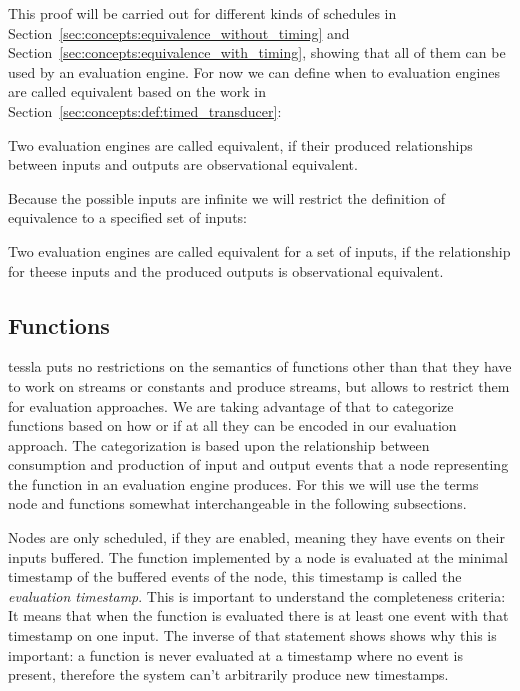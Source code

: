 This proof will be carried out for different kinds of schedules in Section~\ref{sec:concepts:equivalence_without_timing} and Section~\ref{sec:concepts:equivalence_with_timing}, showing that all of them can be used by an evaluation engine.
For now we can define when to evaluation engines are called equivalent based on the work in Section~\ref{sec:concepts:def:timed_transducer}:

\begin{definition}[name=Equivalence of Evaluation Engines]\label{def:equivalence_eval_engine}
  Two evaluation engines are called equivalent, if their produced relationships between inputs and outputs are observational equivalent.
\end{definition}

Because the possible inputs are infinite we will restrict the definition of equivalence to a specified set of inputs:

\begin{definition}[name=Equivalence of Evaluation Engines for Specified Inputs]\label{def:equivalence_eval_engine_specific_inputs}
  Two evaluation engines are called equivalent for a set of inputs, if the relationship for theese inputs and the produced outputs is observational equivalent.
\end{definition}

\subsection{ Functions}
\label{sec:concepts:def:tessla_functions}

\gls{tessla} puts no restrictions on the semantics of functions other than that they have to work on streams or constants and produce streams, but allows to restrict them for evaluation approaches.
We are taking advantage of that to categorize functions based on how or if at all they can be encoded in our evaluation approach.
The categorization is based upon the relationship between consumption and production of input and output events that a node representing the function in an evaluation engine produces.
For this we will use the terms node and functions somewhat interchangeable in the following subsections.

Nodes are only scheduled, if they are enabled, meaning they have events on their inputs buffered.
The function implemented by a node is evaluated at the minimal timestamp of the buffered events of the node, this timestamp is called the \emph{evaluation timestamp}.
This is important to understand the completeness criteria: It means that when the function is evaluated there is at least one event with that timestamp on one input.
The inverse of that statement shows shows why this is important: a function is never evaluated at a timestamp where no event is present, therefore the system can't arbitrarily produce new timestamps.

